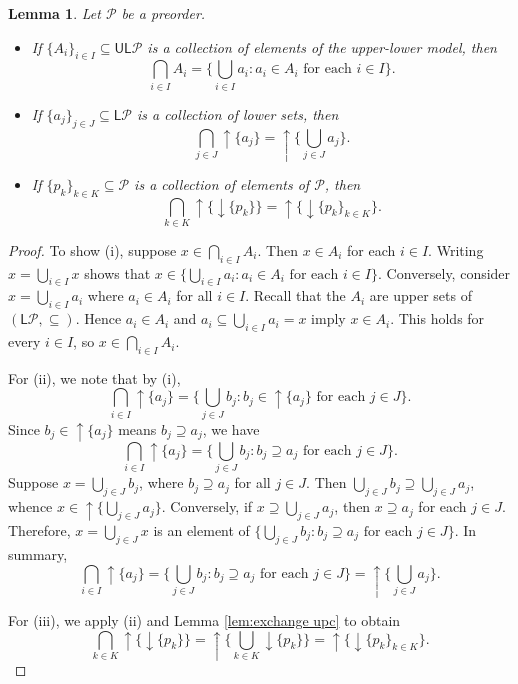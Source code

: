 \documentclass[12pt]{article}
\theoremstyle{definition}
\theoremstyle{plain}
\newtheorem{lemma}[definition]{Lemma}
\theoremstyle{plain}
\theoremstyle{plain}
\theoremstyle{plain}
\theoremstyle{remark}
\theoremstyle{remark}
\newcommand{\mc}[1]{\mathcal{#1}}
\newcommand{\sub}{\subseteq}
\newcommand{\low}{\mathsf{L}}
\newcommand{\upper}{\mathsf{U}}
\newcommand{\upc}[1]{{\uparrow #1}}
\newcommand{\lwc}[1]{{\downarrow #1}}
\begin{document}
\begin{lemma}\label{lem:intersection as union}
	Let $\mc{P}$ be a preorder.
	\begin{itemize}
		\item[(i)] If $\{ A_i \}_{i \in I} \sub \upper\low\mc{P}$ is a collection of elements of the upper-lower model, then
		$$\bigcap_{i \in I} A_i = \{ \bigcup_{i \in I} a_i : a_i \in A_i \text{ for each } i \in I \} .$$
		\item[(ii)] If $\{a_j\}_{j \in J} \sub \low\mc{P}$ is a collection of lower sets, then
		$$\bigcap_{j \in J} \upc{\{a_j\}} =\upc{ \{ \bigcup_{j \in J} a_j \}} .$$
		\item[(iii)] If $\{p_k\}_{k \in K} \sub \mc{P}$ is a collection of elements of $\mc{P}$, then
		$$\bigcap_{k \in K} \upc{\{ \lwc{\{p_k\}} \}} =\upc{ \{ \lwc{ \{p_k\}_{k \in K} } \}} .$$
	\end{itemize}	
\end{lemma} 
\begin{proof}
	To show (i), suppose $x \in \bigcap_{i \in I} A_i$. Then $x \in A_i$ for each $i \in I$. Writing $x = \bigcup_{i \in I} x$ shows that $x \in \{ \bigcup_{i \in I} a_i : a_i \in A_i \text{ for each } i \in I \}$. Conversely, consider $x = \bigcup_{i \in I} a_i$ where $a_i \in A_i$ for all $i \in I$. Recall that the $A_i$ are upper sets of $(\low\mc{P},\sub)$. Hence $a_i \in A_i$ and $a_i \sub \bigcup_{i \in I} a_i = x$ imply $x \in A_i$. This holds for every $i \in I$, so $x \in \bigcap_{i \in I} A_i$.
	
	For (ii), we note that by (i), 
	$$\bigcap_{i \in I} \upc{\{a_j\}} = \{ \bigcup_{j \in J} b_j : b_j \in \upc{\{a_j\}}  \text{ for each } j \in J \}.$$
	Since $b_j \in \upc{\{a_j\}}$ means $b_j \supseteq a_j$, we have
	$$\bigcap_{i \in I} \upc{\{a_j\}} = \{ \bigcup_{j \in J} b_j : b_j \supseteq a_j \text{ for each } j \in J \}.$$ 
	Suppose $x = \bigcup_{j \in J} b_j$, where $b_j \supseteq a_j$ for all $j \in J$. Then $\bigcup_{j \in J} b_j \supseteq \bigcup_{j \in J} a_j $, whence $x \in \upc{ \{ \bigcup_{j \in J} a_j \}}$. Conversely, if $x \supseteq \bigcup_{j \in J} a_j$, then $x \supseteq  a_j$ for each $j \in J$. Therefore, $x = \bigcup_{j \in J} x$ is an element of $\{ \bigcup_{j \in J} b_j : b_j \supseteq a_j \text{ for each } j \in J \}$. In summary,
	$$\bigcap_{i \in I} \upc{\{a_j\}} = \{ \bigcup_{j \in J} b_j : b_j \supseteq a_j \text{ for each } j \in J \} = \upc{ \{ \bigcup_{j \in J} a_j \}}.$$ 
	
	For (iii), we apply (ii) and Lemma \ref{lem:exchange upc} to obtain
	$$ \bigcap_{k \in K} \upc{\{ \lwc{\{p_k\}} \}} =  \upc{ \{ \bigcup_{k \in K} \lwc{\{p_k\}} \}} = \upc{ \{ \lwc{ \{p_k\}_{k \in K} } \}}.$$
\end{proof}
\end{document}
